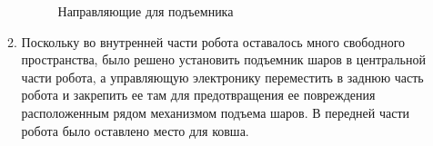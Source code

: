 \begin{enumerate}
\begin{enumerate}
\begin{figure}[H]
\begin{minipage}[h]{0.31\linewidth}
      	\end{minipage}
      	\caption{Направляющие для подъемника}
      \end{figure}
      
      \item Поскольку во внутренней части робота оставалось много свободного пространства, было решено установить подъемник шаров в центральной части робота, а управляющую электронику переместить в заднюю часть робота и закрепить ее там для предотвращения ее повреждения расположенным рядом механизмом подъема шаров. В передней части робота было оставлено место для ковша. 
       

\end{enumerate}
\end{enumerate}
